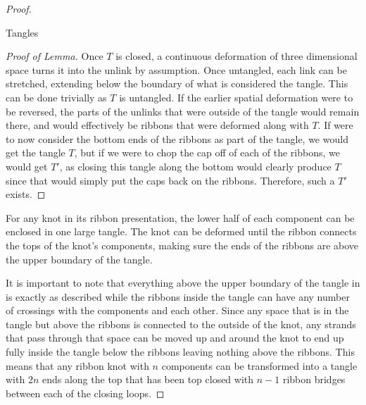 \begin{paper}
\begin{proof}
\begin{paperlem}{Tangles}
\end{paperlem}
\begin{proof}[Proof of Lemma]
Once $T$ is closed, a continuous deformation of three dimensional space turns it
into the unlink by assumption.
Once untangled, each link can be stretched, extending below the boundary of what
is considered the tangle.
This can be done trivially as $T$ is untangled.
If the earlier spatial deformation were to be reversed, the parts of the unlinks
that were outside of the tangle would remain there, and would effectively be
ribbons that were deformed along with $T$.
If were to now consider the bottom ends of the ribbons as part of the tangle, we
would get the tangle $T$, but if we were to chop the cap off of each of the
ribbons, we would get $T'$, as closing this tangle along the bottom would
clearly produce $T$ since that would simply put the caps back on the ribbons.
Therefore, such a $T'$ exists.
\end{proof}
For any knot in its ribbon presentation, the lower half of each component can be
enclosed in one large tangle.
The knot can be deformed until the ribbon connects the tops of the knot's
components, making sure the ends of the ribbons are above the upper boundary of
the tangle.



It is important to note that everything above the upper boundary of the tangle
in \figLowered is exactly as described while the ribbons inside the tangle can
have any number of crossings with the components and each other.
Since any space that is in the tangle but above the ribbons is connected to the
outside of the knot, any strands that pass through that space can be moved up
and around the knot to end up fully inside the tangle below the ribbons leaving
nothing above the ribbons.
This means that any ribbon knot with $n$ components can be transformed into a
tangle with $2n$ ends along the top that has been top closed with $n-1$ ribbon
bridges between each of the closing loops.


\end{proof}
\end{paper}
